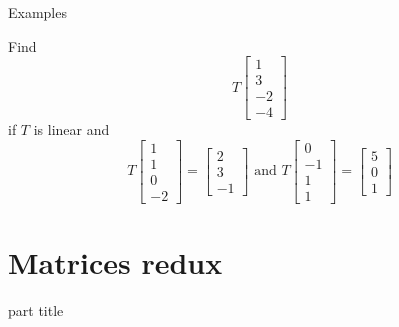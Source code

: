 \documentclass{beamer}
\begin{document}
\begin{frame}{Examples}
\begin{example}
	Find
	\begin{equation*}
	T \left[
	\begin{array}{c}
	1\\
	3\\
	-2\\
	-4
	\end{array}
	\right]
	\end{equation*}
	if $T$ is linear and
	\begin{equation*}
	T \left[
	\begin{array}{c}
	1\\
	1\\
	0\\
	-2
	\end{array}
	\right] = \left[
	\begin{array}{c}
	2\\
	3\\
	-1
	\end{array}
	\right]\text{ and } T \left[
	\begin{array}{c}
	0\\
	-1\\
	1\\
	1
	\end{array}
	\right] = \left[
	\begin{array}{c}
	5\\
	0\\
	1
	\end{array}
	\right]
	\end{equation*}
\end{example}
\end{frame}

\section{Matrices redux}

\begin{frame}
\begin{beamercolorbox}[sep=12pt,center]{part title}
\insertsection\par
\end{beamercolorbox}
\end{frame}
\end{document}
